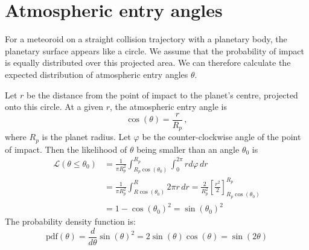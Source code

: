 \section{Atmospheric entry angles}
For a meteoroid on a straight collision trajectory with a planetary body, the planetary surface appears like a circle. We assume that the probability of impact is equally distributed over this projected area. We can therefore calculate the expected distribution of atmospheric entry angles $\theta$.

Let $r$ be the distance from the point of impact to the planet's centre, projected onto this circle. At a given $r$, the atmospheric entry angle is
\begin{equation*}
    \cos(\theta) = \frac{r}{R_p}\,,
\end{equation*}
where $R_p$ is the planet radius. Let $\varphi$ be the counter-clockwise angle of the point of impact. Then the likelihood of $\theta$ being smaller than an angle $\theta_0$ is
\begin{align}
    \mathcal{L}(\theta \leq \theta_0) &= \frac{1}{\pi R_p^2} \int_{R_p\cos(\theta_0)}^{R_p} \int_0^{2\pi} r d\varphi\, dr \nonumber\\
    &= \frac{1}{\pi R_p^2} \int_{R\cos(\theta_0)}^R 2\pi r\, dr = \frac{2}{R_p^2} \left[\frac{r^2}{2}\right]_{R_p\cos(\theta_0)}^{R_p} \nonumber\\
    &= 1 - \cos(\theta_0)^2 = \sin(\theta_0)^2
\end{align}
The probability density function is:
\begin{equation}
    \mathrm{pdf}(\theta) = \frac{d}{d\theta}\sin(\theta)^2 = 2\sin(\theta)\cos(\theta) = \sin(2\theta)
\end{equation}
